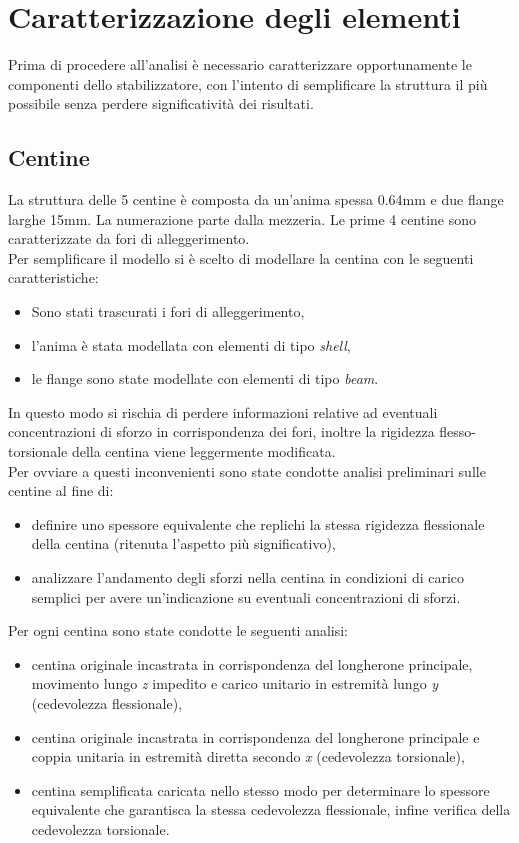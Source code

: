 \documentclass[
10pt, %
a4paper, %
oneside, %
headinclude,footinclude, %
BCOR5mm, %
]{scrartcl}
\begin{document}
\section{Caratterizzazione degli elementi}

Prima di procedere all'analisi è necessario caratterizzare opportunamente le componenti dello stabilizzatore, con l'intento di semplificare la struttura il più possibile senza perdere significatività dei risultati. 

\subsection{Centine}

La struttura delle 5 centine è composta da un'anima spessa 0.64mm e due flange larghe 15mm. La numerazione parte dalla mezzeria. Le prime 4 centine sono caratterizzate da fori di alleggerimento.\\
Per semplificare il modello si è scelto di modellare la centina con le seguenti caratteristiche:

\begin{itemize}
	\item Sono stati trascurati i fori di alleggerimento,
	\item l'anima è stata modellata con elementi di tipo \emph{shell},
	\item le flange sono state modellate con elementi di tipo \emph{beam}.
\end{itemize} 

In questo modo si rischia di perdere informazioni relative ad eventuali concentrazioni di sforzo in corrispondenza dei fori, inoltre la rigidezza flesso-torsionale della centina viene leggermente modificata.\\
Per ovviare a questi inconvenienti sono state condotte analisi preliminari sulle centine al fine di:

\begin{itemize}
	\item definire uno spessore equivalente che replichi la stessa rigidezza flessionale della centina (ritenuta l'aspetto più significativo),
	\item analizzare l'andamento degli sforzi nella centina in condizioni di carico semplici per avere un'indicazione su eventuali concentrazioni di sforzi.
\end{itemize}

Per ogni centina sono state condotte le seguenti analisi:

\begin{itemize}
	\item centina originale incastrata in corrispondenza del longherone principale, movimento lungo \emph{z} impedito e carico unitario in estremità lungo \emph{y} (cedevolezza flessionale),
	\item centina originale incastrata in corrispondenza del longherone principale e coppia unitaria in estremità diretta secondo \emph{x} (cedevolezza torsionale),
	\item centina semplificata caricata nello stesso modo per determinare lo spessore equivalente che garantisca la stessa cedevolezza flessionale, infine verifica della cedevolezza torsionale. 
\end{itemize}
\end{document}
